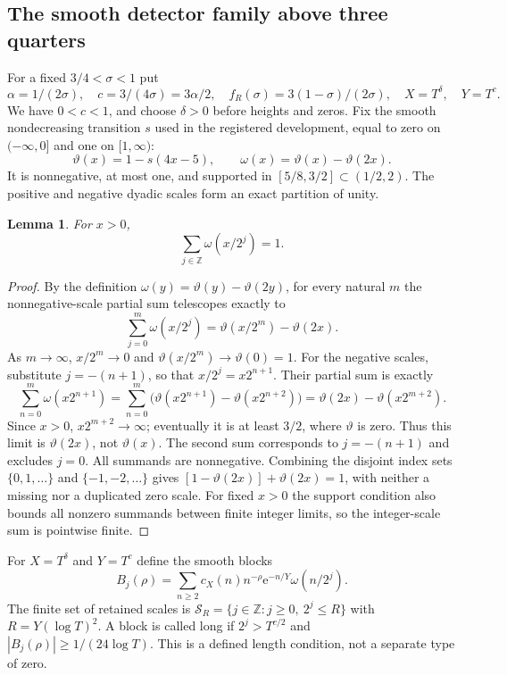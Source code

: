 \documentclass[11pt,a4paper,oneside]{article}
\newtheorem{lemma}[theorem]{Lemma}
\theoremstyle{definition}
\newcommand{\Z}{\mathbb Z}
\newcommand{\e}{\mathrm e}
\numberwithin{equation}{section}
\begin{document}
\subsection{The smooth detector family above three quarters}
For a fixed $3/4<\sigma<1$ put
\[
 \alpha=1/(2\sigma),\quad c=3/(4\sigma)=3\alpha/2,\quad
 f_R(\sigma)=3(1-\sigma)/(2\sigma),\quad X=T^\delta,\quad Y=T^c.
\]
We have $0<c<1$, and choose $\delta>0$ before heights and zeros.
Fix the smooth nondecreasing transition $s$ used in the registered development, equal to zero on $(-\infty,0]$ and one on $[1,\infty)$:
\[
 \vartheta(x)=1-s(4x-5),\qquad \omega(x)=\vartheta(x)-\vartheta(2x).
\]
It is nonnegative, at most one, and supported in $[5/8,3/2]\subset(1/2,2)$.
The positive and negative dyadic scales form an exact partition of unity.
\begin{lemma}\label{lem:signedpartition}
For $x>0$,
\[
 \sum_{j\in\Z}\omega(x/2^j)=1.
\]

\end{lemma}
\begin{proof}
By the definition $\omega(y)=\vartheta(y)-\vartheta(2y)$, for every natural $m$ the
nonnegative-scale partial sum telescopes exactly to
\[
 \sum_{j=0}^{m}\omega(x/2^j)=\vartheta(x/2^m)-\vartheta(2x).
\]
As $m\to\infty$, $x/2^m\to0$ and $\vartheta(x/2^m)\to \vartheta(0)=1$.
For the negative scales, substitute $j=-(n+1)$, so that
$x/2^j=x2^{n+1}$. Their partial sum is exactly
\[
 \sum_{n=0}^{m}\omega(x2^{n+1})
 =\sum_{n=0}^{m}\bigl(\vartheta(x2^{n+1})-\vartheta(x2^{n+2})\bigr)
 =\vartheta(2x)-\vartheta(x2^{m+2}).
\]
Since $x>0$, $x2^{m+2}\to\infty$; eventually it is at least $3/2$, where
$\vartheta$ is zero. Thus this limit is $\vartheta(2x)$, not $\vartheta(x)$.
The second sum corresponds to $j=-(n+1)$ and excludes $j=0$. All summands are nonnegative. Combining the disjoint index sets
$\{0,1,\ldots\}$ and $\{-1,-2,\ldots\}$ gives
$[1-\vartheta(2x)]+\vartheta(2x)=1$, with neither a missing nor a duplicated zero scale.
For fixed $x>0$ the support condition also bounds all nonzero summands
between finite integer limits, so the integer-scale sum is pointwise finite.
\end{proof}
For $X=T^\delta$ and $Y=T^c$ define the smooth blocks
\[
 B_j(\rho)=\sum_{n\ge2}c_X(n)n^{-\rho}\e^{-n/Y}\omega(n/2^j).
\]
The finite set of retained scales is $\mathcal S_R=\{j\in\Z:j\ge0,\ 2^j\le R\}$ with $R=Y(\log T)^2$. A block is called long if $2^j>T^{c/2}$ and $|B_j(\rho)|\ge1/(24\log T)$. This is a defined length condition, not a separate type of zero.
\end{document}
